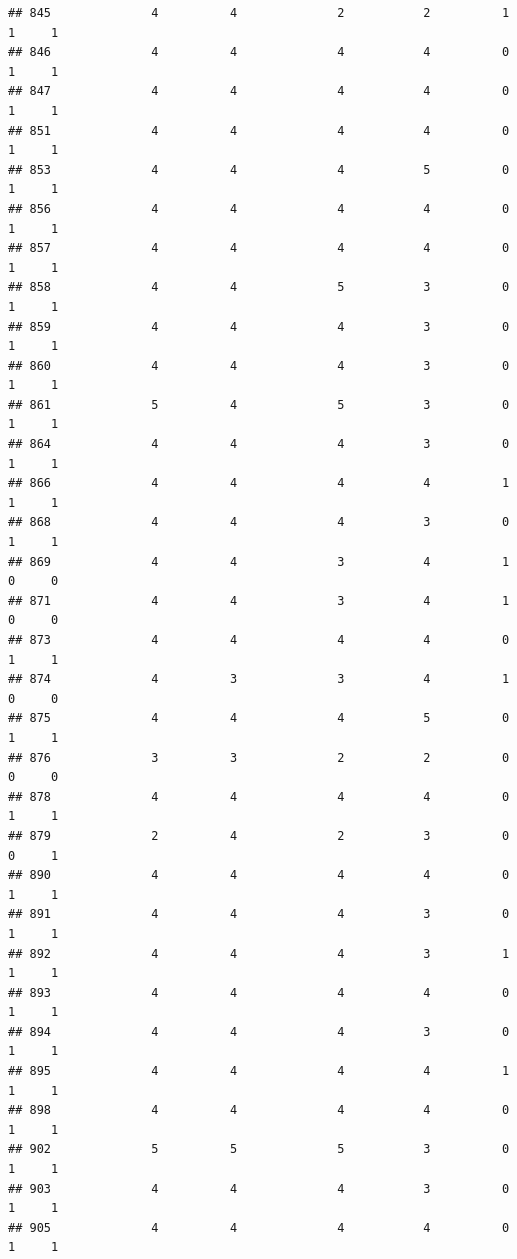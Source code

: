 \documentclass[
]{article}
\begin{document}
\begin{verbatim}
## 845              4          4              2           2          1    1     1
## 846              4          4              4           4          0    1     1
## 847              4          4              4           4          0    1     1
## 851              4          4              4           4          0    1     1
## 853              4          4              4           5          0    1     1
## 856              4          4              4           4          0    1     1
## 857              4          4              4           4          0    1     1
## 858              4          4              5           3          0    1     1
## 859              4          4              4           3          0    1     1
## 860              4          4              4           3          0    1     1
## 861              5          4              5           3          0    1     1
## 864              4          4              4           3          0    1     1
## 866              4          4              4           4          1    1     1
## 868              4          4              4           3          0    1     1
## 869              4          4              3           4          1    0     0
## 871              4          4              3           4          1    0     0
## 873              4          4              4           4          0    1     1
## 874              4          3              3           4          1    0     0
## 875              4          4              4           5          0    1     1
## 876              3          3              2           2          0    0     0
## 878              4          4              4           4          0    1     1
## 879              2          4              2           3          0    0     1
## 890              4          4              4           4          0    1     1
## 891              4          4              4           3          0    1     1
## 892              4          4              4           3          1    1     1
## 893              4          4              4           4          0    1     1
## 894              4          4              4           3          0    1     1
## 895              4          4              4           4          1    1     1
## 898              4          4              4           4          0    1     1
## 902              5          5              5           3          0    1     1
## 903              4          4              4           3          0    1     1
## 905              4          4              4           4          0    1     1

\end{verbatim}
\end{document}
